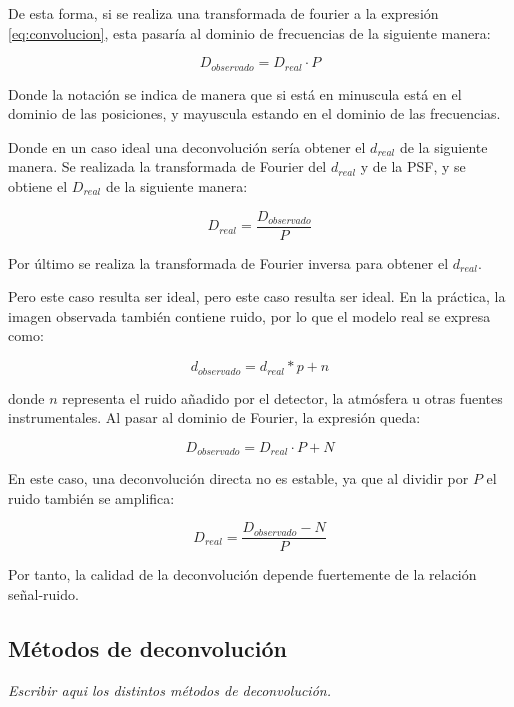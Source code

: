 De esta forma, si se realiza una transformada de fourier a la expresión \ref{eq:convolucion}, esta pasaría al dominio de frecuencias de la siguiente manera:

\begin{equation}
    \label{eq:convolucionFourier}
    D_{observado} = D_{real} \cdot P
\end{equation}

Donde la notación se indica de manera que si está en minuscula está en el dominio de las posiciones, y mayuscula estando en el dominio de las frecuencias.

Donde en un caso ideal una deconvolución sería obtener el $d_{real}$ de la siguiente manera. Se realizada la transformada de Fourier del $d_{real}$ y de la PSF, y se obtiene el $D_{real}$ de la siguiente manera:

\begin{equation}
    \label{eq:deconvolucionIdeal}
    D_{real} = \frac{D_{observado}}{P}
\end{equation}

Por último se realiza la transformada de Fourier inversa para obtener el $d_{real}$.

Pero este caso resulta ser ideal, 
pero este caso resulta ser ideal. En la práctica, la imagen observada también contiene ruido, por lo que el modelo real se expresa como:

\begin{equation}
    \label{eq:convolucionRuido}
    d_{observado} = d_{real} * p + n
\end{equation}

donde $n$ representa el ruido añadido por el detector, la atmósfera u otras fuentes instrumentales. Al pasar al dominio de Fourier, la expresión queda:

\begin{equation}
    \label{eq:convolucionFourierRuido}
    D_{observado} = D_{real} \cdot P + N
\end{equation}

En este caso, una deconvolución directa no es estable, ya que al dividir por $P$ el ruido también se amplifica:

\begin{equation}
    \label{eq:deconvolucionRuido}
    D_{real} = \frac{D_{observado} - N}{P}
\end{equation}

Por tanto, la calidad de la deconvolución depende fuertemente de la relación señal-ruido.


\subsection{Métodos de deconvolución}
\textit{Escribir aqui los distintos métodos de deconvolución.}

